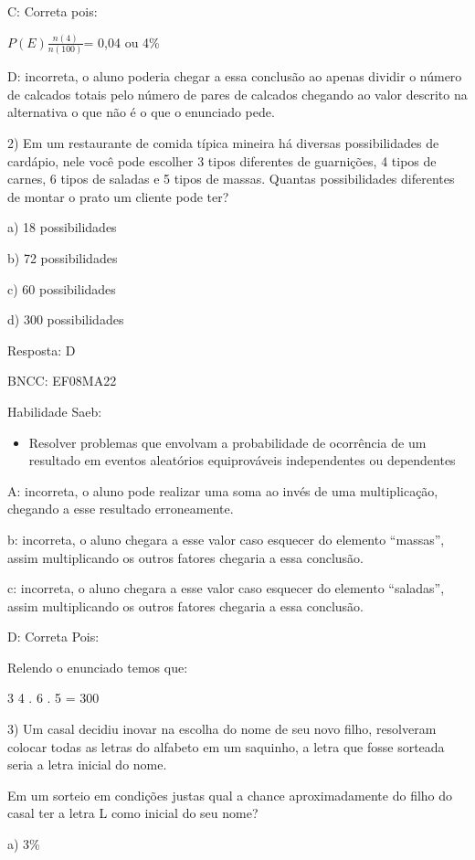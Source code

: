 C: Correta pois:

\(P(E)\frac{n(4)}{n(100)}\)= 0,04 ou 4\%

D: incorreta, o aluno poderia chegar a essa conclusão ao apenas dividir
o número de calcados totais pelo número de pares de calcados chegando ao
valor descrito na alternativa o que não é o que o enunciado pede.

2) Em um restaurante de comida típica mineira há diversas possibilidades
de cardápio, nele você pode escolher 3 tipos diferentes de guarnições, 4
tipos de carnes, 6 tipos de saladas e 5 tipos de massas. Quantas
possibilidades diferentes de montar o prato um cliente pode ter?

a) 18 possibilidades

b) 72 possibilidades

c) 60 possibilidades

d) 300 possibilidades

Resposta: D

BNCC: EF08MA22

Habilidade Saeb:

\begin{itemize}
\tightlist
\item
  Resolver problemas que envolvam a probabilidade de ocorrência de um
  resultado em eventos aleatórios equiprováveis independentes ou
  dependentes
\end{itemize}

A: incorreta, o aluno pode realizar uma soma ao invés de uma
multiplicação, chegando a esse resultado erroneamente.

b: incorreta, o aluno chegara a esse valor caso esquecer do elemento
``massas'', assim multiplicando os outros fatores chegaria a essa
conclusão.

c: incorreta, o aluno chegara a esse valor caso esquecer do elemento
``saladas'', assim multiplicando os outros fatores chegaria a essa
conclusão.

D: Correta Pois:

Relendo o enunciado temos que:

\num{3} 4 . 6 . 5 = 300

3) Um casal decidiu inovar na escolha do nome de seu novo filho,
resolveram colocar todas as letras do alfabeto em um saquinho, a letra
que fosse sorteada seria a letra inicial do nome.

Em um sorteio em condições justas qual a chance aproximadamente do filho
do casal ter a letra L como inicial do seu nome?

a) 3\%

